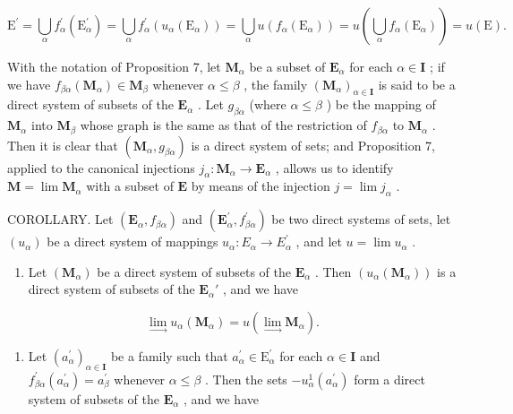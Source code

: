 \[
\mathrm{E} ^ {\prime} = \bigcup_ {\alpha} f _ {\alpha} ^ {\prime} (\mathrm{E} _ {\alpha} ^ {\prime}) = \bigcup_ {\alpha} f _ {\alpha} ^ {\prime} (u _ {\alpha} (\mathrm{E} _ {\alpha})) = \bigcup_ {\alpha} u (f _ {\alpha} (\mathrm{E} _ {\alpha})) = u \left(\bigcup_ {\alpha} f _ {\alpha} (\mathrm{E} _ {\alpha})\right) = u (\mathrm{E}).
\]

With the notation of Proposition 7, let \(\mathbf{M}_{\alpha}\) be a subset of \(\mathbf{E}_{\alpha}\) for each \(\alpha \in \mathbf{I}\) ; if we have \(f_{\beta \alpha}(\mathbf{M}_{\alpha}) \in \mathbf{M}_{\beta}\) whenever \(\alpha \leqslant \beta\) , the family \((\mathbf{M}_{\alpha})_{\alpha \in \mathbf{I}}\) is said to be a direct system of subsets of the \(\mathbf{E}_{\alpha}\) . Let \(g_{\beta \alpha}\) (where \(\alpha \leqslant \beta\) ) be the mapping of \(\mathbf{M}_{\alpha}\) into \(\mathbf{M}_{\beta}\) whose graph is the same as that of the restriction of \(f_{\beta \alpha}\) to \(\mathbf{M}_{\alpha}\) . Then it is clear that \((\mathbf{M}_{\alpha}, g_{\beta \alpha})\) is a direct system of sets; and Proposition 7, applied to the canonical injections \(j_{\alpha}: \mathbf{M}_{\alpha} \to \mathbf{E}_{\alpha}\) , allows us to identify \(\mathbf{M} = \lim \mathbf{M}_{\alpha}\) with a subset of \(\mathbf{E}\) by means of the injection \(j = \lim j_{\alpha}\) .

COROLLARY. Let \((\mathbf{E}_{\alpha}, f_{\beta\alpha})\) and \((\mathbf{E}_{\alpha}^{\prime}, f_{\beta\alpha}^{\prime})\) be two direct systems of sets, let \((u_{\alpha})\) be a direct system of mappings \(u_{\alpha}: E_{\alpha} \to E_{\alpha}^{\prime}\) , and let \(u = \lim u_{\alpha}\) .

\begin{enumerate}
\def\labelenumi{(\roman{enumi})}
\tightlist
\item
  Let \((\mathbf{M}_{\alpha})\) be a direct system of subsets of the \(\mathbf{E}_{\alpha}\) . Then \((u_{\alpha}(\mathbf{M}_{\alpha}))\) is a direct system of subsets of the \(\mathbf{E}_{\alpha}'\) , and we have
\end{enumerate}

\[
\lim _ {\rightarrow} u _ {\alpha} (\mathbf {M} _ {\alpha}) = u (\lim _ {\rightarrow} \mathbf {M} _ {\alpha}).\tag{26}
\]

\begin{enumerate}
\def\labelenumi{(\roman{enumi})}
\setcounter{enumi}{1}
\tightlist
\item
  Let \((a_{\alpha}^{\prime})_{\alpha \in \mathbf{I}}\) be a family such that \(a_{\alpha}^{\prime} \in \mathrm{E}_{\alpha}^{\prime}\) for each \(\alpha \in \mathbf{I}\) and \(f_{\beta \alpha}^{\prime}(a_{\alpha}^{\prime}) = a_{\beta}^{\prime}\) whenever \(\alpha \leqslant \beta\) . Then the sets \(-u_{\alpha}^{1}(a_{\alpha}^{\prime})\) form a direct system of subsets of the \(\mathbf{E}_{\alpha}\) , and we have
\end{enumerate}

